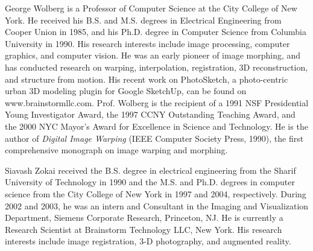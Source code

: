 \documentclass[10pt,journal,cspaper,compsoc]{IEEEtran}
\begin{document}
\vspace{-0.2in}
\begin{IEEEbiography}{George Wolberg}
is a Professor of Computer Science at the City College of New York.
He received his B.S. and M.S. degrees in Electrical Engineering
from Cooper Union in 1985, and his Ph.D. degree in Computer
Science from Columbia University in 1990.
His research interests include image processing, computer graphics,
and computer vision.
He was an early pioneer of image morphing, and has conducted research on
warping, interpolation, registration, 3D reconstruction, and structure
from motion.
His recent work on PhotoSketch, a photo-centric urban 3D modeling plugin
for Google SketchUp, can be found on www.brainstormllc.com.
Prof. Wolberg is the recipient of a 1991 NSF Presidential Young
Investigator Award, the 1997 CCNY Outstanding Teaching Award,
and the 2000 NYC Mayor's Award for Excellence in Science and Technology.
He is the author of {\it Digital Image Warping}
(IEEE Computer Society Press, 1990),
the first comprehensive monograph on image warping and morphing.

\end{IEEEbiography}

\vspace{-0.4in}
\begin{IEEEbiography}{Siavash Zokai}
received the B.S. degree in electrical
engineering from the Sharif University of Technology
in 1990 and the M.S. and Ph.D. degrees in
computer science from the City College of New
York in 1997 and 2004, respectively.
During 2002 and 2003, he was an intern and
Consultant in the Imaging and Visualization Department,
Siemens Corporate Research, Princeton, NJ.
He is currently a Research Scientist at Brainstorm
Technology LLC, New York. His research interests
include image registration, 3-D photography, and
augmented reality.
\end{IEEEbiography}
\vspace{-0.2in}
\end{document}
